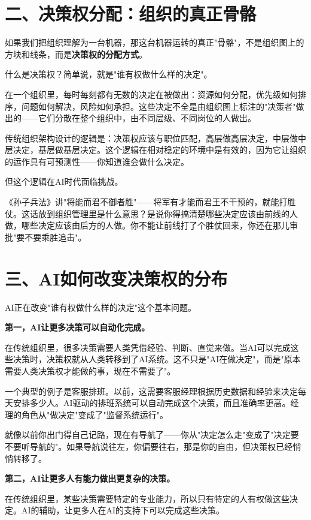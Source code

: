 \section{二、决策权分配：组织的真正骨骼}


如果我们把组织理解为一台机器，那这台机器运转的真正"骨骼"，不是组织图上的方块和线条，而是\textbf{决策权的分配方式}。

什么是决策权？简单说，就是"谁有权做什么样的决定"。

在一个组织里，每时每刻都有无数的决定在被做出：资源如何分配，优先级如何排序，问题如何解决，风险如何承担。这些决定不全是由组织图上标注的"决策者"做出的——它们分散在整个组织中，由不同层级、不同岗位的人做出。

传统组织架构设计的逻辑是：决策权应该与职位匹配，高层做高层决定，中层做中层决定，基层做基层决定。这个逻辑在相对稳定的环境中是有效的，因为它让组织的运作具有可预测性——你知道谁会做什么决定。

但这个逻辑在AI时代面临挑战。

《孙子兵法》讲"将能而君不御者胜"——将军有才能而君王不干预的，就能打胜仗。这话放到组织管理里是什么意思？是说你得搞清楚哪些决定应该由前线的人做，哪些决定应该由后方的人做。你不能让前线打了个胜仗回来，你还在那儿审批"要不要乘胜追击"。

\section{三、AI如何改变决策权的分布}


AI正在改变"谁有权做什么样的决定"这个基本问题。

\textbf{第一，AI让更多决策可以自动化完成。}

在传统组织里，很多决策需要人类凭借经验、判断、直觉来做。当AI可以完成这些决策时，决策权就从人类转移到了AI系统。这不只是"AI在做决定"，而是"原本需要人类决策权才能做的事，现在不需要了"。

一个典型的例子是客服排班。以前，这需要客服经理根据历史数据和经验来决定每天安排多少人。AI驱动的排班系统可以自动完成这个决策，而且准确率更高。经理的角色从"做决定"变成了"监督系统运行"。

就像以前你出门得自己记路，现在有导航了——你从"决定怎么走"变成了"决定要不要听导航的"。如果导航说往左，你偏要往右，那是你的自由，但决策权已经悄悄转移了。

\textbf{第二，AI让更多人有能力做出更复杂的决策。}

在传统组织里，某些决策需要特定的专业能力，所以只有特定的人有权做这些决定。AI的辅助，让更多人在AI的支持下可以完成这些决策。

